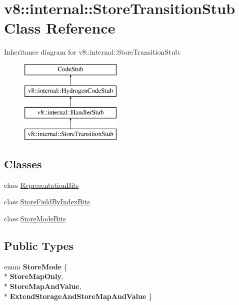 \hypertarget{classv8_1_1internal_1_1_store_transition_stub}{}\section{v8\+:\+:internal\+:\+:Store\+Transition\+Stub Class Reference}
\label{classv8_1_1internal_1_1_store_transition_stub}
Inheritance diagram for v8\+:\+:internal\+:\+:Store\+Transition\+Stub\+:\begin{figure}[H]
\begin{center}
\leavevmode
\includegraphics[height=4.000000cm]{classv8_1_1internal_1_1_store_transition_stub}
\end{center}
\end{figure}
\subsection*{Classes}
\begin{DoxyCompactItemize}
\item 
class \hyperlink{classv8_1_1internal_1_1_store_transition_stub_1_1_representation_bits}{Representation\+Bits}
\item 
class \hyperlink{classv8_1_1internal_1_1_store_transition_stub_1_1_store_field_by_index_bits}{Store\+Field\+By\+Index\+Bits}
\item 
class \hyperlink{classv8_1_1internal_1_1_store_transition_stub_1_1_store_mode_bits}{Store\+Mode\+Bits}
\end{DoxyCompactItemize}
\subsection*{Public Types}
\begin{DoxyCompactItemize}
\item 
enum {\bfseries Store\+Mode} \{ \\*
{\bfseries Store\+Map\+Only}, 
\\*
{\bfseries Store\+Map\+And\+Value}, 
\\*
{\bfseries Extend\+Storage\+And\+Store\+Map\+And\+Value}
 \}\hypertarget{classv8_1_1internal_1_1_store_transition_stub_a9cf2fcd34dcb9a916d71d37dbdfd31d7}{}\label{classv8_1_1internal_1_1_store_transition_stub_a9cf2fcd34dcb9a916d71d37dbdfd31d7}

\end{DoxyCompactItemize}
